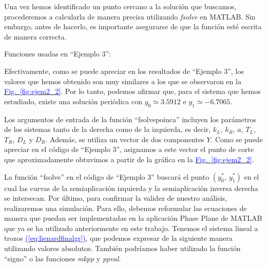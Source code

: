 \documentclass[12pt,a4paper]{report} %
\newcommand{\fref}[1]{\hyperref[#1]{\textcolor{blue}{Fig.~\ref*{#1}}}}
\newcommand{\eref}[1]{\hyperref[#1]{\textcolor{blue}{(\ref*{#1})}}}
\begin{document}
	Una vez hemos identificado un punto cercano a la solución que buscamos, procederemos a calcularla de manera precisa utilizando \textit{fsolve} en MATLAB. Sin embargo, antes de hacerlo, es importante asegurarse de que la función esté escrita de manera correcta.
		
	\vspace{1cm}
	
	\vspace{1cm}
	
	\newpage
	
	\noindent Funciones usadas en ``Ejemplo 3'':
	\vspace{0.5cm}
	\vspace{0.5cm}
	
	\vspace{1cm} Efectivamente, como se puede apreciar en los resultados de ``Ejemplo 3'', los valores que hemos obtenido son muy similares a los que se observaron en la \fref{fig:ejem2_2}. Por lo tanto, podemos afirmar que, para el sistema que hemos estudiado, existe una solución periódica con $y_0\simeq3.5912$ e $y_1\simeq-6.7065$.

	
	\vspace{0.5cm}Los argumentos de entrada de la función ``fsolvepoinca'' incluyen los parámetros de los sistemas tanto de la derecha como de la izquierda, es decir, $k_L$, $k_R$, $a$, $T_L$, $T_R$, $D_L$ y $D_R$. Además, se utiliza un vector de dos componentes $Y$. Como se puede apreciar en el código de ``Ejemplo 3'', asignamos a este vector el punto de corte que aproximadamente obtuvimos a partir de la gráfica en la \fref{fig:ejem2_2}.
	
	
	\vspace{0.5cm}La función ``fsolve'' en el código de ``Ejemplo 3'' buscará el punto $\left(y_0^*,\: y_1^*\right)$ en el cual las curvas de la semiaplicación izquierda y la semiaplicación inversa derecha se intersecan.
	\newpage
	Por último, para confirmar la validez de nuestro análisis, realizaremos una simulación. Para ello, debemos reformular las ecuaciones de manera que puedan ser implementadas en la aplicación Phase Plane de MATLAB que ya se ha utilizado anteriormente en este trabajo. Tenemos el sistema lineal a trozos \eref{eq:lienardfinalgr}, que podemos expresar de la siguiente manera utilizando valores absolutos. También podríamos haber utilizado la función ``signo'' o las funciones \textit{mkpp} y \textit{ppval}.
	
\end{document}
